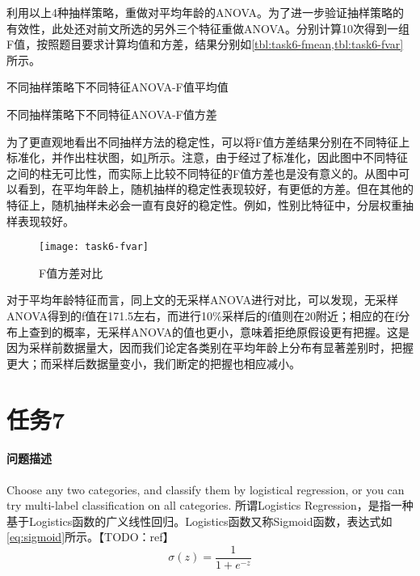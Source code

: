 \documentclass[a4paper,12pt]{article}
\begin{document}
    利用以上4种抽样策略，重做对平均年龄的ANOVA。为了进一步验证抽样策略的有效性，此处还对前文所选的另外三个特征重做ANOVA。分别计算10次得到一组F值，按照题目要求计算均值和方差，结果分别如\cref{tbl:task6-fmean,tbl:task6-fvar}所示。

    \begin{table}[htbp]
      \centering
      \caption{不同抽样策略下不同特征ANOVA-F值平均值}
      \label{tbl:task6-fmean}
      
    \end{table}
    \begin{table}[htbp]
      \centering
      \caption{不同抽样策略下不同特征ANOVA-F值方差}
      \label{tbl:task6-fvar}
      
    \end{table}

    为了更直观地看出不同抽样方法的稳定性，可以将F值方差结果分别在不同特征上标准化，并作出柱状图，如\cref{fig:task6-fvar}所示。注意，由于经过了标准化，因此图中不同特征之间的柱无可比性，而实际上比较不同特征的F值方差也是没有意义的。从图中可以看到，在平均年龄上，随机抽样的稳定性表现较好，有更低的方差。但在其他的特征上，随机抽样未必会一直有良好的稳定性。例如，性别比特征中，分层权重抽样表现较好。

    \begin{figure}[htbp]
      \centering
      \texttt{[image: task6-fvar]}
      \caption{F值方差对比}
      \label{fig:task6-fvar}
    \end{figure}

    对于平均年龄特征而言，同上文的无采样ANOVA进行对比，可以发现，无采样ANOVA得到的f值在171.5左右，而进行10\%采样后的f值则在20附近；相应的在f分布上查到的概率，无采样ANOVA的值也更小，意味着拒绝原假设更有把握。这是因为采样前数据量大，因而我们论定各类别在平均年龄上分布有显著差别时，把握更大；而采样后数据量变小，我们断定的把握也相应减小。

    \section{任务7} %
    \paragraph{问题描述} Choose any two categories, and classify them by logistical regression, or you can try multi-label classification on all categories.
    所谓Logistics Regression，是指一种基于Logistics函数的广义线性回归。Logistics函数又称Sigmoid函数，表达式如\cref{eq:sigmoid}所示。【TODO：ref】
    \begin{equation}
      \label{eq:sigmoid}
      \sigma(z) = \frac{1}{1+e^{-z}}
    \end{equation}
\end{document}
